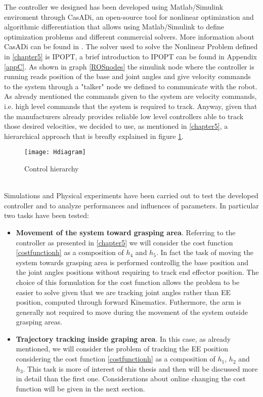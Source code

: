 The controller we designed has been developed using Matlab/Simulink enviroment through CasADi, an open-source tool for nonlinear optimization and algorithmic differentiation that allows using Matlab/Simulink to define optimization problems and different commercial solvers. More information about CasADi can be found in \cite{Andersson2018}. The solver used to solve the Nonlinear Problem defined in \ref{chapter5} is IPOPT, a brief introduction to IPOPT can be found in Appendix \ref{appC}. As shown in graph \ref{ROSnodes} the simulink node where the controller is running reads position of the base and joint angles and give velocity commands to the system through a "talker" node we defined to communicate with the robot. As already mentioned the commands given to the system are velocity commands, i.e. high level commands that the system is required to track. Anyway, given that the manufacturers already provides reliable low level controllers able to track those desired velocities, we decided to use, as mentioned in \ref{chapter5}, a hierarchical approach that is breafly explained in figure \ref{Hdiagram}.  
\begin{figure}[h!]
	\begin{center} 
		\texttt{[image: Hdiagram]}
		\centering
		\label{Hdiagram}
		\caption{Control hierarchy} 
	\end{center}
\end{figure}
\\
Simulations and Physical experiments have been carried out to test the developed controller and to analyze performances and influences of parameters. In particular two tasks have been tested: 

\begin{itemize}
	\item \textbf{Movement of the system toward grasping area}. Referring to the controller as presented in \ref{chapter5} we will consider the cost function \ref{costfunctionh} as a composition of $h_4$ and $h_5$. In fact the task of moving the system towards grasping area is performed controllig the base position and the joint angles positions without requiring to track end effector position. The choice of this formulation for the cost function allows the problem to be easier to solve given that we are tracking joint angles rather than EE position, computed through forward Kinematics. Futhermore, the arm is generally not required to move during the movement of the system outside grasping areas.

	\item \textbf{Trajectory tracking inside graping area}. In this case, as already mentioned, we will consider the problem of tracking the EE position considering the cost function \ref{costfunctionh} as a composition of $h_1$, $h_2$ and $h_3$. This task is more of interest of this thesis and then will be discussed more in detail than the first one. Considerations about online changing the cost function will be given in the next section. 
\end{itemize}
